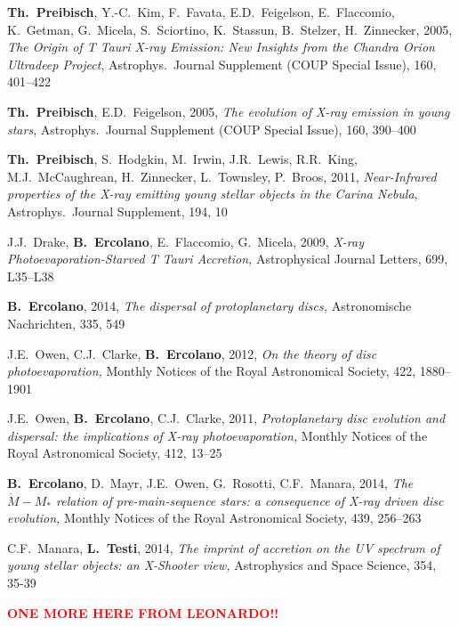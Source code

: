 \documentclass[10pt,fleqn,twoside]{article}
\newcommand{\todo}[1]{\textcolor{red}{\bf #1}}
\newenvironment{literature}%
 {\begin{list}{}{%
   \setlength{\topsep}{0em}%
   \setlength{\parskip}{0em}%
   \setlength{\parsep}{0em}%
   \setlength{\itemsep}{0em}%
   \setlength{\rightmargin}{0em}%
   \setlength{\leftmargin}{2em}%
   \setlength{\itemindent}{-2em}}\normalfont\scriptsize}%
 {\end{list}}
\begin{document}
\begin{multicols}{2}
\begin{literature}
\item
\textbf{Th.~Preibisch}, Y.-C.~Kim, F.~Favata, E.D.~Feigelson, E.~Flaccomio,
K.~Getman, G.~Micela, S.~Sciortino, K.~Stassun, B.~Stelzer, H.~Zinnecker,
2005,
{\em The Origin of T Tauri X-ray Emission: New Insights from
the Chandra Orion Ultradeep Project}, Astrophys.~Journal Supplement
(COUP Special Issue), 160, 401--422
\item
\textbf{Th.~Preibisch}, E.D.~Feigelson, 2005,
{\em The evolution of X-ray emission in young stars},
Astrophys.~Journal Supplement (COUP Special Issue), 160, 390--400
\item
\textbf{Th.~Preibisch}, S.~Hodgkin, M.~Irwin, J.R.~Lewis, R.R.~King, M.J.~McCaughrean, H.~Zinnecker, L.~Townsley,
P.~Broos, 2011,
{\em Near-Infrared properties of the X-ray emitting young stellar objects in the
Carina Nebula}, Astrophys.~Journal Supplement, 194, 10
\item
J.J.~Drake,  \textbf{B.~Ercolano}, E.~Flaccomio, G.~Micela, 2009,
{\em X-ray Photoevaporation-Starved T Tauri Accretion,}
Astrophysical Journal Letters, 699,  L35--L38 
\item
\textbf{B.~Ercolano}, 2014,
{\em The dispersal of protoplanetary discs,}
	Astronomische Nachrichten, 335, 549
\item
J.E.~Owen, C.J.~Clarke, \textbf{B.~Ercolano}, 2012,
{\em On the theory of disc photoevaporation,}
Monthly Notices of the Royal Astronomical Society, 422, 1880--1901
\item
J.E.~Owen, \textbf{B.~Ercolano}, C.J.~Clarke, 2011,
{\em Protoplanetary disc evolution and dispersal: the implications of X-ray photoevaporation,}
Monthly Notices of the Royal Astronomical Society, 412, 13--25 
\item
\textbf{B.~Ercolano}, D.~Mayr, J.E.~Owen, G.~Rosotti, C.F.~Manara, 2014,
{\em The $\dot{M}-M_*$ relation of pre-main-sequence stars: a consequence of X-ray driven disc evolution,}
Monthly Notices of the Royal Astronomical Society, 439, 256--263 
\item
C.F.~Manara, \textbf{L.~Testi}, 2014,
{\em The imprint of accretion on the UV spectrum of young stellar objects: an X-Shooter view,}
Astrophysics and Space Science, 354, 35-39  
\item
\todo{ONE MORE HERE FROM LEONARDO!!}
\end{literature}
\end{multicols}
\end{document}
